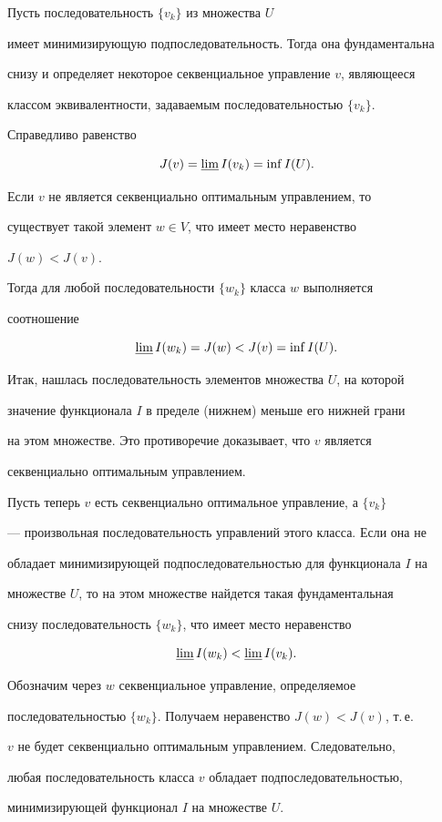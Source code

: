 


\begin{pf} 


Пусть последовательность $\{v_k\}$ из множества $U$ 


имеет минимизирующую подпоследовательность. Тогда она фундаментальна 


снизу и определяет некоторое секвенциальное управление $v$, являющееся 


классом эквивалентности, задаваемым последовательностью $\{v_k\}$. 


Справедливо равенство 


$$ 


J(v)=\varliminf I(v_k)=\inf I(U). 


$$ 


Если $v$ не является секвенциально оптимальным управлением, то 


существует такой элемент $w\in V$, что имеет место неравенство 


$J(w)<J(v)$. 


Тогда для любой последовательности $\{w_k\}$ класса $w$ выполняется 


соотношение 


$$ 


\varliminf I(w_k)=J(w)<J(v)=\inf I(U). 


$$ 


Итак, нашлась последовательность элементов множества $U$, на которой 


значение функционала $I$ в пределе (нижнем) меньше его нижней грани 


на этом множестве. Это противоречие доказывает, что $v$ является 


секвенциально оптимальным управлением. 


 


Пусть теперь $v$ есть секвенциально оптимальное управление, а $\{v_k\}$ 


--- произвольная последовательность управлений этого класса. Если она не 


обладает минимизирующей подпоследовательностью для функционала $I$ на 


множестве $U$, то на этом множестве найдется такая фундаментальная 


снизу последовательность $\{w_k\}$, что имеет место неравенство 


$$ 


\varliminf I(w_k)<\varliminf I(v_k). 


$$ 


Обозначим через $w$ секвенциальное управление, определяемое 


последовательностью $\{w_k\}$. Получаем неравенство $J(w)<J(v)$, т.\,е. 


$v$ не будет секвенциально оптимальным управлением. Следовательно, 


любая последовательность класса $v$ обладает подпоследовательностью, 


минимизирующей функционал $I$ на множестве $U$. 


\end{pf} 


